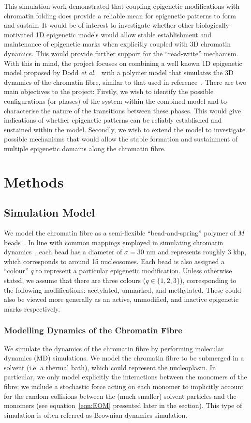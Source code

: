 \documentclass[12pt]{article}
\newcommand{\etal}{\emph{et al.}}
\begin{document}
This simulation work demonstrated that coupling epigenetic modifications with chromatin folding does provide a reliable mean for epigenetic patterns to form and sustain. It would be of interest to investigate whether other biologically-motivated 1D epigenetic models would allow stable establishment and maintenance of epigenetic marks when explicitly coupled with 3D chromatin dynamics. This would provide further support for the ``read-write'' mechanism. With this in mind, the project focuses on combining a well known 1D epigenetic model proposed by Dodd \etal~\cite{dodd2007} with a polymer model that simulates the 3D dynamics of the chromatin fibre, similar to that used in reference~\cite{brackley2013, michieletto2016}. There are two main objectives to the project: Firstly, we wish to identify the possible configurations (or phases) of the system within the combined model and to characterise the nature of the transitions between these phases. This would give indications of whether epigenetic patterns can be reliably established and sustained within the model. Secondly, we wish to extend the model to investigate possible mechanisms that would allow the stable formation and sustainment of multiple epigenetic domains along the chromatin fibre. 
\pagebreak
\section{Methods}
\subsection{Simulation Model}
We model the chromatin fibre as a semi-flexible ``bead-and-spring'' polymer of $M$ beads~\cite{kremer1990}. In line with common mappings employed in simulating chromatin dynamics~\cite{rosa2008, mirny2011, brackley2016, michieletto2016}, each bead has a diameter of $\sigma = 30$ nm and represents roughly 3 kbp, which corresponds to around 15 nucleosomes. Each bead is also assigned a ``colour'' $q$ to represent a particular epigenetic modification. Unless otherwise stated, we assume that there are three colours ($q \in \{1, 2, 3\}$), corresponding to the following modifications: acetylated, unmarked, and methylated. These could also be viewed more generally as an active, unmodified, and inactive epigenetic marks respectively.

\subsubsection{Modelling Dynamics of the Chromatin Fibre}
We simulate the dynamics of the chromatin fibre by performing molecular dynamics (MD) simulations. We model the chromatin fibre to be submerged in a solvent (i.e. a thermal bath), which could represent the nucleoplasm. In particular, we only model explicitly the interactions between the monomers of the fibre; we include a stochastic force acting on each monomer to implicitly account for the random collisions between the (much smaller) solvent particles and the monomers (see equation~\ref{eqn:EOM} presented later in the section). This type of simulation is often referred as Brownian dynamics simulation.
\end{document}
